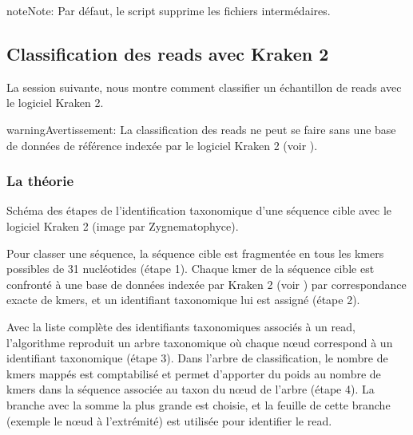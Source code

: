 \documentclass[letterpaper,10pt,french]{sphinxmanual}
\let\sphinxpxdimen\pdfpxdimen\else\newdimen\sphinxpxdimen
\begin{document}
\begin{sphinxadmonition}{note}{Note:}
Par défaut, le script supprime les fichiers intermédaires.
\end{sphinxadmonition}


\subsection{Classification des reads avec Kraken 2}
\label{\detokenize{tutorial:classification-des-reads-avec-kraken-2}}\label{\detokenize{tutorial:classification-kraken2}}
La session suivante, nous montre comment classifier un échantillon de reads avec le logiciel Kraken 2.

\begin{sphinxadmonition}{warning}{Avertissement:}
La classification des reads ne peut se faire sans une base de données de référence indexée par le logiciel Kraken 2 (voir {\hyperref[\detokenize{tutorial:indexation-kraken2}]{}}).
\end{sphinxadmonition}


\subsubsection{La théorie}
\label{\detokenize{tutorial:id24}}
\noindent{\hspace*{\fill}\sphinxincludegraphics[width=450\sphinxpxdimen]{{classification_kraken2}.png}}

Schéma des étapes de l’identification taxonomique d’une séquence cible avec le logiciel Kraken 2 (image par Zygnematophyce).

Pour classer une séquence, la séquence cible est fragmentée en tous les k\sphinxhyphen{}mers possibles de 31 nucléotides (étape 1). Chaque k\sphinxhyphen{}mer de la séquence cible est confronté à une base de données indexée par Kraken 2 (voir {\hyperref[\detokenize{tutorial:indexation-kraken2}]{}}) par correspondance exacte de k\sphinxhyphen{}mers, et un identifiant taxonomique lui est assigné (étape 2).

Avec la liste complète des identifiants taxonomiques associés à un read, l’algorithme reproduit un arbre taxonomique où chaque nœud correspond à un identifiant taxonomique (étape 3). Dans l’arbre de classification, le nombre de k\sphinxhyphen{}mers mappés est comptabilisé et permet d’apporter du poids au nombre de k\sphinxhyphen{}mers dans la séquence associée au taxon du nœud de l’arbre (étape 4). La branche avec la somme la plus grande est choisie, et la feuille de cette branche (exemple le nœud à l’extrémité) est utilisée pour identifier le read.
\end{document}
